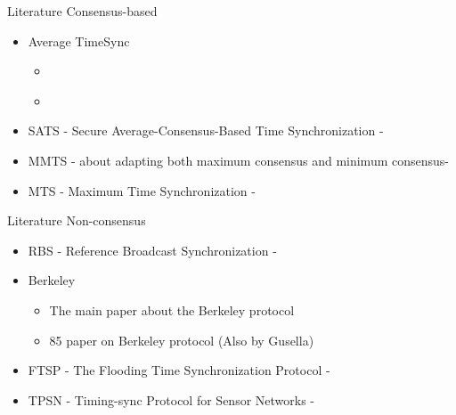 \documentclass{beamer}
\begin{document}
\begin{frame}{Literature}
    Consensus-based
    
        \begin{itemize}
            \item Average TimeSync
                \begin{itemize}
                \item \cite{SchenatoGamba07}
                    \item \cite{LucaFiorentin11}
                \end{itemize}
            \item SATS - Secure Average-Consensus-Based Time Synchronization - \cite{HeChengShiChen13}
            \item MMTS - about adapting both maximum consensus and minimum consensus- \cite{HeLiChenCheng13}
            \item MTS - Maximum Time Synchronization - \cite{HeChengShiChen14}
        \end{itemize}
\end{frame}

\begin{frame}{Literature}
    Non-consensus
    
        \begin{itemize}
        \item  RBS - Reference Broadcast Synchronization - \cite{ElsonGirodEstrin02}
        \item Berkeley
          \begin{itemize}
          \item \cite{Gusella89} The main paper about the Berkeley protocol
          \item \cite{GusellaZatti85} 85 paper on Berkeley protocol (Also by Gusella)
          \end{itemize}
        \item FTSP - The Flooding Time Synchronization Protocol - \cite{Maroti04} 
        \item TPSN - Timing-sync Protocol for Sensor Networks - \cite{GaneriwalKumarSrivastava03}
    \end{itemize}

\end{frame}
 
\end{document}
